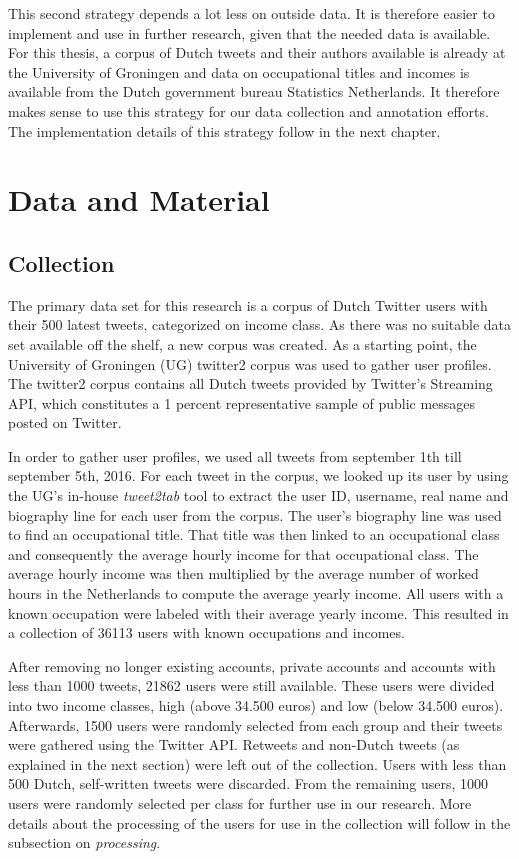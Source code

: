 \documentclass[
10pt, %
a4paper, %
oneside, %
headinclude,footinclude, %
] {book}%
\begin{document}
This second strategy depends a lot less on outside data. It is therefore easier to implement and use in further research, given that the needed data is available.  For this thesis, a corpus of Dutch tweets and their authors available is already at the University of Groningen and data on occupational titles and incomes is available from the Dutch government bureau Statistics Netherlands. It therefore makes sense to use this strategy for our data collection and annotation efforts. The implementation details of this strategy follow in the next chapter.


\chapter{Data and Material}
\section{Collection} 
The primary data set for this research is a corpus of Dutch Twitter users with their 500 latest tweets, categorized on income class. As there was no suitable data set available off the shelf, a new corpus was created. As a starting point, the University of Groningen (UG) twitter2 corpus was used to gather user profiles. The twitter2 corpus contains all Dutch tweets provided by Twitter's Streaming API, which constitutes a 1 percent representative sample of public messages posted on Twitter. 

In order to gather user profiles, we used all tweets from september 1th till september 5th, 2016. For each tweet in the corpus, we looked up its user by using the UG's in-house \textit{tweet2tab} tool to extract the user ID, username, real name and biography line for each user from the corpus. The user's biography line was used to find an occupational title. That title was then linked to an occupational class and consequently the average hourly income for that occupational class. The average hourly income was then multiplied by the average number of worked hours in the Netherlands to compute the average yearly income. All users with a known occupation were labeled with their average yearly income. This resulted in a collection of 36113 users with known occupations and incomes.

After removing no longer existing accounts, private accounts and accounts with less than 1000 tweets, 21862 users were still available. These users were divided into two income classes, high (above 34.500 euros) and low (below 34.500 euros). Afterwards, 1500 users were randomly selected from each group and their tweets were gathered using the Twitter API. Retweets and non-Dutch tweets (as explained in the next section) were left out of the collection. Users with less than 500 Dutch, self-written tweets were discarded. From the remaining users, 1000 users were randomly selected per class for further use in our research. More details about the processing of the users for use in the collection will follow in the subsection on \textit{processing}.
\end{document}

